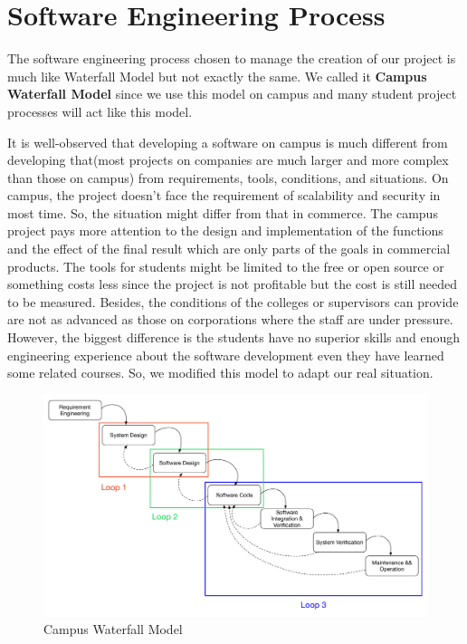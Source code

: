 \documentclass[a4paper,11pt]{article}
\begin{document}
\section{Software Engineering Process}
The software engineering process chosen to manage the creation of our project is much like Waterfall Model but not exactly the same. We called it \textbf{Campus Waterfall Model} since we use this model on campus and many student project processes will act like this model.

It is well-observed that developing a software on campus is much different from developing that(most projects on companies are much larger and more complex than those on campus) from requirements, tools, conditions, and situations. On campus, the project doesn't face the requirement of scalability and security in most time. So, the situation might differ from that in commerce. The campus project pays more attention to the design and implementation of the functions and the effect of the final result which are only parts of the goals in commercial products. The tools for students might be limited to the free or open source or something costs less since the project is not profitable but the cost is still needed to be measured. Besides, the conditions of the colleges or supervisors can provide are not as advanced as those on corporations where the staff are under pressure. However, the biggest difference is the students have no superior skills and enough engineering experience about the software development even they have learned some related courses. So, we modified this model to adapt our real situation.

\begin{figure}[htbp]
\includegraphics[scale=0.32]{image/campus_waterfall.pdf}
\caption{Campus Waterfall Model}
\end{figure}
\end{document}
